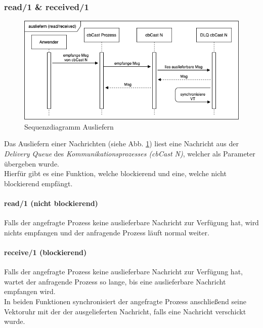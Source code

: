 \subsubsection{read/1 \& received/1}

\begin{figure}[htbp]
\begin{center}
\includegraphics[scale=0.5]{Latex/Bilder/Sequenz_ausliefern.png}
\caption{\label{fig:sequence_cbCast_read_receive} Sequenzdiagramm Ausliefern}
\end{center}
\end{figure}

Das Ausliefern einer Nachrichten (siehe Abb. \ref{fig:sequence_cbCast_read_receive}) liest eine Nachricht aus der \textit{Delivery Queue} des \textit{Kommunikationsprozesses (cbCast N)}, welcher als Parameter übergeben wurde.\\
Hierfür gibt es eine Funktion, welche blockierend und eine, welche nicht blockierend empfängt.

\paragraph{read/1 (nicht blockierend)}

Falls der angefragte Prozess keine auslieferbare Nachricht zur Verfügung hat, wird nichts empfangen und der anfragende Prozess läuft normal weiter.

\paragraph{receive/1 (blockierend)}

Falls der angefragte Prozess keine auslieferbare Nachricht zur Verfügung hat, wartet der anfragende Prozess so lange, bis eine auslieferbare Nachricht empfangen wird.\\

In beiden Funktionen synchronisiert der angefragte Prozess anschließend seine Vektoruhr mit der der ausgelieferten Nachricht, falls eine Nachricht verschickt wurde.

